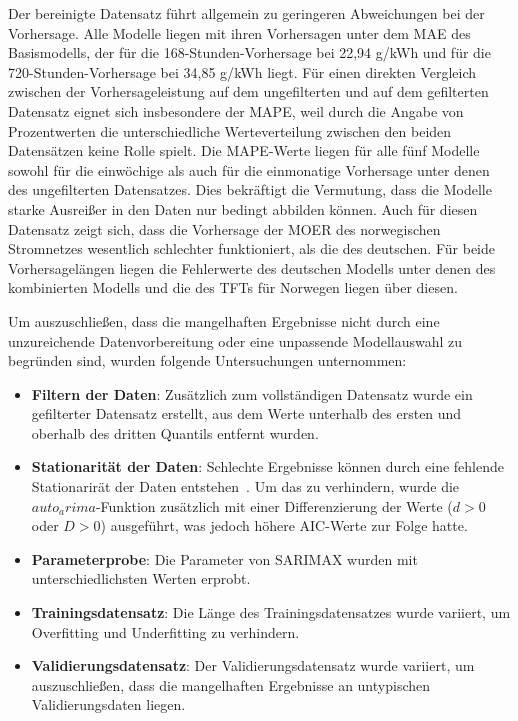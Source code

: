 Der bereinigte Datensatz führt allgemein zu geringeren Abweichungen bei der Vorhersage.
Alle Modelle liegen mit ihren Vorhersagen unter dem \ac{MAE} des Basismodells, der für die 168-Stunden-Vorhersage bei 22,94 g/\ac{kWh} und für die 720-Stunden-Vorhersage bei 34,85 g/\ac{kWh} liegt.
Für einen direkten Vergleich zwischen der Vorhersageleistung auf dem ungefilterten und auf dem gefilterten Datensatz eignet sich insbesondere der \ac{MAPE}, weil durch die Angabe von Prozentwerten die unterschiedliche Werteverteilung zwischen den beiden Datensätzen keine Rolle spielt.
Die \ac{MAPE}-Werte liegen für alle fünf Modelle sowohl für die einwöchige als auch für die einmonatige Vorhersage unter denen des ungefilterten Datensatzes.
Dies bekräftigt die Vermutung, dass die Modelle starke Ausreißer in den Daten nur bedingt abbilden können.
Auch für diesen Datensatz zeigt sich, dass die Vorhersage der \ac{MOER} des norwegischen Stromnetzes wesentlich schlechter funktioniert, als die des deutschen.
Für beide Vorhersagelängen liegen die Fehlerwerte des deutschen Modells unter denen des kombinierten Modells und die des \acp{TFT} für Norwegen liegen über diesen.

Um auszuschließen, dass die mangelhaften Ergebnisse nicht durch eine unzureichende Datenvorbereitung oder eine unpassende Modellauswahl zu begründen sind, wurden folgende Untersuchungen unternommen:
\begin{itemize}
 \item \textbf{Filtern der Daten}: Zusätzlich zum vollständigen Datensatz wurde ein gefilterter Datensatz erstellt, aus dem Werte unterhalb des ersten und oberhalb des dritten Quantils entfernt wurden.
 \item \textbf{Stationarität der Daten}: Schlechte Ergebnisse können durch eine fehlende Stationarirät der Daten entstehen~\cite{Artley.26.4.2022}. Um das zu verhindern, wurde die $auto_arima$-Funktion zusätzlich mit einer Differenzierung der Werte ($d > 0$ oder $D > 0$) ausgeführt, was jedoch höhere \ac{AIC}-Werte zur Folge hatte.
 \item \textbf{Parameterprobe}: Die Parameter von \ac{SARIMAX} wurden mit unterschiedlichsten Werten erprobt.
 \item \textbf{Trainingsdatensatz}: Die Länge des Trainingsdatensatzes wurde variiert, um Overfitting und Underfitting zu verhindern.
 \item \textbf{Validierungsdatensatz}: Der Validierungsdatensatz wurde variiert, um auszuschließen, dass die mangelhaften Ergebnisse an untypischen Validierungsdaten liegen.
\end{itemize}

